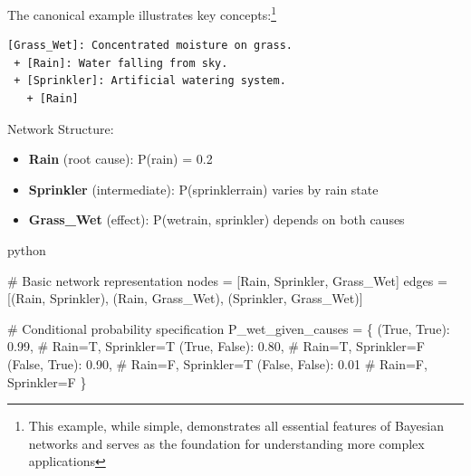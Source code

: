 \documentclass[
  11pt,
  letterpaper,
]{book}
\newenvironment{Shaded}{\begin{snugshade}}{\end{snugshade}}
\newcommand{\CommentTok}[1]{\textcolor[rgb]{0.37,0.37,0.37}{#1}}
\newcommand{\FloatTok}[1]{\textcolor[rgb]{0.68,0.00,0.00}{#1}}
\newcommand{\NormalTok}[1]{\textcolor[rgb]{0.00,0.23,0.31}{#1}}
\newcommand{\OperatorTok}[1]{\textcolor[rgb]{0.37,0.37,0.37}{#1}}
\newcommand{\StringTok}[1]{\textcolor[rgb]{0.13,0.47,0.30}{#1}}
\newcommand{\VariableTok}[1]{\textcolor[rgb]{0.07,0.07,0.07}{#1}}
\providecommand{\tightlist}{%
  \setlength{\itemsep}{0pt}\setlength{\parskip}{0pt}}
\begin{document}
The canonical example illustrates key concepts:\footnote{This example,
  while simple, demonstrates all essential features of Bayesian networks
  and serves as the foundation for understanding more complex
  applications}

\begin{verbatim}
[Grass_Wet]: Concentrated moisture on grass. 
 + [Rain]: Water falling from sky.
 + [Sprinkler]: Artificial watering system.
   + [Rain]
\end{verbatim}

Network Structure:

\begin{itemize}
\tightlist
\item
  \textbf{Rain} (root cause): P(rain) = 0.2
\item
  \textbf{Sprinkler} (intermediate): P(sprinkler\textbar rain) varies by
  rain state
\item
  \textbf{Grass\_Wet} (effect): P(wet\textbar rain, sprinkler) depends
  on both causes
\end{itemize}

python

\begin{Shaded}
\begin{Highlighting}[]
\CommentTok{\# Basic network representation}
\NormalTok{nodes }\OperatorTok{=}\NormalTok{ [}\StringTok{\textquotesingle{}Rain\textquotesingle{}}\NormalTok{, }\StringTok{\textquotesingle{}Sprinkler\textquotesingle{}}\NormalTok{, }\StringTok{\textquotesingle{}Grass\_Wet\textquotesingle{}}\NormalTok{]}
\NormalTok{edges }\OperatorTok{=}\NormalTok{ [(}\StringTok{\textquotesingle{}Rain\textquotesingle{}}\NormalTok{, }\StringTok{\textquotesingle{}Sprinkler\textquotesingle{}}\NormalTok{), (}\StringTok{\textquotesingle{}Rain\textquotesingle{}}\NormalTok{, }\StringTok{\textquotesingle{}Grass\_Wet\textquotesingle{}}\NormalTok{), (}\StringTok{\textquotesingle{}Sprinkler\textquotesingle{}}\NormalTok{, }\StringTok{\textquotesingle{}Grass\_Wet\textquotesingle{}}\NormalTok{)]}

\CommentTok{\# Conditional probability specification}
\NormalTok{P\_wet\_given\_causes }\OperatorTok{=}\NormalTok{ \{}
\NormalTok{    (}\VariableTok{True}\NormalTok{, }\VariableTok{True}\NormalTok{): }\FloatTok{0.99}\NormalTok{,    }\CommentTok{\# Rain=T, Sprinkler=T}
\NormalTok{    (}\VariableTok{True}\NormalTok{, }\VariableTok{False}\NormalTok{): }\FloatTok{0.80}\NormalTok{,   }\CommentTok{\# Rain=T, Sprinkler=F  }
\NormalTok{    (}\VariableTok{False}\NormalTok{, }\VariableTok{True}\NormalTok{): }\FloatTok{0.90}\NormalTok{,   }\CommentTok{\# Rain=F, Sprinkler=T}
\NormalTok{    (}\VariableTok{False}\NormalTok{, }\VariableTok{False}\NormalTok{): }\FloatTok{0.01}   \CommentTok{\# Rain=F, Sprinkler=F}
\NormalTok{\}}
\end{Highlighting}
\end{Shaded}
\end{document}
